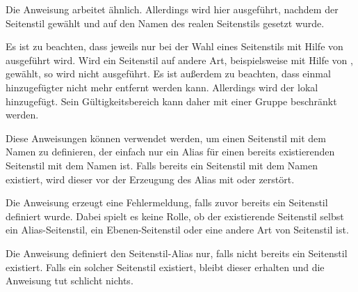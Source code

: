 Die Anweisung  arbeitet ähnlich. Allerdings
wird hier  ausgeführt, nachdem der Seitenstil gewählt und
 auf den Namen des realen Seitenstils
gesetzt wurde.

Es ist zu beachten, dass  jeweils nur bei der
Wahl eines Seitenstils mit Hilfe von 
ausgeführt wird. Wird ein Seitenstil auf andere Art, beispielsweise mit Hilfe
von , gewählt, so wird  nicht
ausgeführt. Es ist außerdem zu beachten, dass einmal
hinzugefügter  nicht mehr entfernt werden kann. Allerdings wird
der  lokal hinzugefügt. Sein Gültigkeitsbereich kann daher mit
einer Gruppe beschränkt werden.%
\EndIndexGroup


\begin{Declaration}
\end{Declaration}
%
%
Diese Anweisungen können verwendet werden, um einen Seitenstil mit dem Namen
 zu definieren, der einfach nur ein Alias für
einen bereits existierenden Seitenstil mit dem Namen  ist. Falls bereits ein Seitenstil mit dem Namen
 existiert, wird dieser vor der Erzeugung des
Alias mit  oder 
zerstört.

Die Anweisung  erzeugt eine Fehlermeldung,
falls zuvor bereits ein Seitenstil 
definiert wurde. Dabei spielt es keine Rolle, ob der existierende Seitenstil
selbst ein Alias-Seitenstil, ein Ebenen-Seitenstil oder eine andere Art von
Seitenstil ist.

Die Anweisung  definiert den Seitenstil-Alias
nur, falls nicht bereits ein Seitenstil
 existiert. Falls ein solcher Seitenstil
existiert, bleibt dieser erhalten und die Anweisung tut schlicht nichts.

